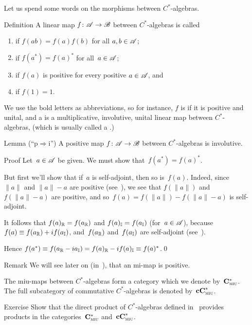 \documentclass[a]{subfiles}
\begin{document}
\begin{parsec}%
\begin{point}%
Let us spend some words
on the morphisms between $C^*$-algebras.
\end{point}
\begin{point}{Definition}
A linear map $f\colon \mathscr{A} \to \mathscr{B}$
between $C^*$-algebras
is called
\begin{enumerate}
\item
{}
if $f(ab)=f(a)f(b)$ for all $a,b\in\mathscr{A}$;
\item
{}
if $f(a^*)=f(a)^*$ for all~$a\in\mathscr{A}$;
\item
{}
if $f(a)$ is positive
for every positive $a\in\mathscr{A}$, and
\item
{}
if $f(1)=1$.
\end{enumerate}
\begin{point}%
We use the bold letters as abbreviations,
so for instance,
$f$ is  if it is positive and unital,
and a 
is a multiplicative, involutive, unital linear map between $C^*$-algebras,
(which is usually called a .)
\end{point}
\end{point}
\begin{point}{Lemma (``p$\Rightarrow$i'')}%
A positive map $f\colon \mathscr{A}\to\mathscr{B}$ between
$C^*$-algebras is involutive.
\begin{point}{Proof}%
Let~$a\in \mathscr{A}$ be given. We must show that~$f(a^*)=f(a)^*$.

But first we'll show that if~$a$ is self-adjoint,
then so is~$f(a)$.
Indeed, since $\|a\|$ and $\|a\|-a$ are positive (see~),
we see that $f(\|a\|)$ and $f(\|a\|-a)$ are positive,
and so~$f(a)=f(\|a\|)-f(\|a\|-a)$ is self-adjoint.

It follows that $f(a)_{\mathbb{R}}=f(a_{\mathbb{R}})$
and $f(a)_{\mathbb{I}}=f(a_{\mathbb{I}})$ (for~$a\in\mathscr{A}$),
because $f(a)\equiv f(a_{\mathbb{R}})+if(a_{\mathbb{I}})$,
and~$f(a_{\mathbb{R}})$ and~$f(a_{\mathbb{I}})$
are self-adjoint
(see~).

Hence $f(a^*)\equiv f(a_{\mathbb{R}}-ia_{\mathbb{I}})
=f(a)_{\mathbb{R}}-if(a)_{\mathbb{I}}\equiv f(a)^*$.\qed
\end{point}
\end{point}
\begin{point}{Remark}%
We will see later on (in~\sref{}),
that an mi-map is positive.
\end{point}
\begin{point}%
The miu-maps between $C^*$-algebras
form a category which we denote by~$\mathbf{C}^*_{\text{\textsc{miu}}}$.
The full subcategory of commutative $C^*$-algebras
is denoted by~$\mathbf{cC}^*_{\text{\textsc{miu}}}$.
\end{point}
\begin{point}{Exercise}%
Show that the direct product of $C^*$-algebras
defined in~
provides products in the categories~$\mathbf{C}^*_{\text{\textsc{miu}}}$
and~$\mathbf{cC}^*_{\text{\textsc{miu}}}$.
\end{point}

\end{parsec}
\end{document}
